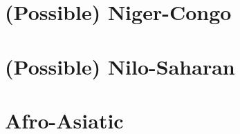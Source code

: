 \documentclass[output=short         
	        ,collection  
	        ,collectionchapter
	        ,collectiontoclongg
 	        ,modfonts,nonflat  
		  ]{langsci/langscibook}                               %
\begin{document}
         
\maketitle                
\frontmatter

\tableofcontents
% 
% 

\mainmatter          

 


\part{(Possible) Niger-Congo}





\part{(Possible) Nilo-Saharan}


\part{Afro-Asiatic}
\end{document}
